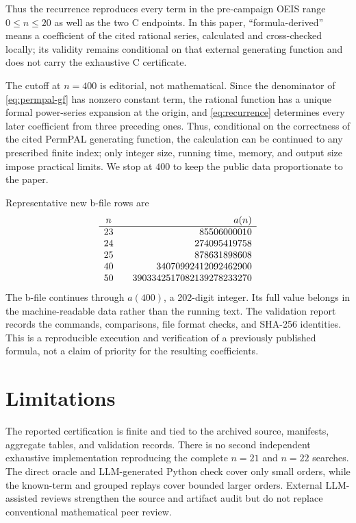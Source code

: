 \documentclass[11pt]{article}
\theoremstyle{definition}
\theoremstyle{remark}
\begin{document}
Thus the recurrence reproduces every term in the pre-campaign OEIS range
$0\leq n\leq20$ as well as the two C endpoints.  In this paper,
``formula-derived'' means a coefficient of the cited rational series,
calculated and cross-checked locally; its validity remains conditional on that
external generating function and does not carry the exhaustive C certificate.

The cutoff at $n=400$ is editorial, not mathematical.  Since the denominator
of \eqref{eq:permpal-gf} has nonzero constant term, the rational function has
a unique formal power-series expansion at the origin, and
\eqref{eq:recurrence} determines every later coefficient from three preceding
ones.  Thus, conditional on the correctness of the cited PermPAL generating
function, the calculation can be continued to any prescribed finite index;
only integer size, running time, memory, and output size impose practical
limits.  We stop at $400$ to keep the public data proportionate to the paper.

Representative new b-file rows are
\[
\begin{array}{c@{\qquad}r}
n & a(n)\\
\hline
23 & 85506000010\\
24 & 274095419758\\
25 & 878631898608\\
40 & 34070992412092462900\\
50 & 3903342517082139278233270
\end{array}
\]
The b-file continues through $a(400)$, a 202-digit integer.  Its full value
belongs in the machine-readable data rather than the running text.  The
validation report records the commands, comparisons, file format checks, and
SHA-256 identities.  This is a reproducible execution and verification of a
previously published formula, not a claim of priority for the resulting
coefficients.

\section{Limitations}
\label{sec:limitations}

The reported certification is finite and tied to the archived source,
manifests, aggregate tables, and validation records.  There is no second
independent exhaustive implementation reproducing the complete $n=21$ and
$n=22$ searches.  The direct oracle and LLM-generated Python check cover only
small orders, while the known-term and grouped replays cover bounded larger
orders.  External LLM-assisted reviews strengthen the source and artifact
audit but do not replace conventional mathematical peer review.
\end{document}
